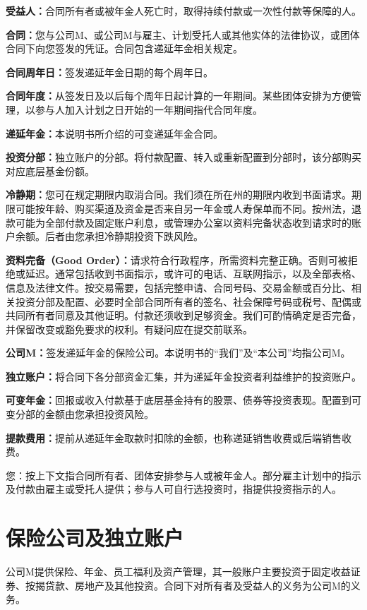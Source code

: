 \documentclass[UTF8,fontset=none,11pt,a4paper]{ctexart}
\begin{document}
\textbf{受益人：}合同所有者或被年金人死亡时，取得持续付款或一次性付款等\allowbreak\mbox{保障的人。}


\textbf{合同：}您与公司M、或公司M与雇主、计划受托人或其他实体的法律协议，或团体合同下向您签发的凭证。合同包含递延年金\allowbreak\mbox{相关规定。}


\textbf{合同周年日：}签发递延年金日期的每\allowbreak\mbox{个周年日。}


\textbf{合同年度：}从签发日及以后每个周年日起计算的一年期间。某些团体安排为方便管理，以参与人加入计划之日开始的一年期间指代\allowbreak\mbox{合同年度。}


\textbf{递延年金：}本说明书所介绍的可变递延\allowbreak\mbox{年金合同。}


\textbf{投资分部：}独立账户的分部。将付款配置、转入或重新配置到分部时，该分部购买对应底层\allowbreak\mbox{基金份额。}


\textbf{冷静期：}您可在规定期限内取消合同。我们须在所在州的期限内收到书面请求。期限可能按年龄、购买渠道及资金是否来自另一年金或人寿保单而不同。按州法，退款可能为全部付款及固定账户利息，或管理办公室以资料完备状态收到请求时的账户余额。后者由您承担冷静期投资\allowbreak\mbox{下跌风险。}


\textbf{资料完备（Good Order）：}请求符合行政程序，所需资料完整正确。否则可被拒绝或延迟。通常包括收到书面指示，或许可的电话、互联网指示，以及全部表格、信息及法律文件。按交易需要，包括完整申请、合同号码、交易金额或百分比、相关投资分部及配置、必要时全部合同所有者的签名、社会保障号码或税号、配偶或共同所有者同意及其他证明。付款还须收到足够资金。我们可酌情确定是否完备，并保留改变或豁免要求的权利。有疑问应在提\allowbreak\mbox{交前联系。}


\textbf{公司M：}签发递延年金的保险公司。本说明书的“我们”及“本公司”均指公司M。


\textbf{独立账户：}将合同下各分部资金汇集，并为递延年金投资者利益维护的\allowbreak\mbox{投资账户。}


\textbf{可变年金：}回报或收入付款基于底层基金持有的股票、债券等投资表现。配置到可变分部的金额由您承担\allowbreak\mbox{投资风险。}


\textbf{提款费用：}提前从递延年金取款时扣除的金额，也称递延销售收费或后端\allowbreak\mbox{销售收费。}


您：按上下文指合同所有者、团体安排参与人或被年金人。部分雇主计划中的指示及付款由雇主或受托人提供；参与人可自行选投资时，指提供投资\allowbreak\mbox{指示的人。}


\section*{保险公司及独立账户}
公司M提供保险、年金、员工福利及资产管理，其一般账户主要投资于固定收益证券、按揭贷款、房地产及其他投资。合同下对所有者及受益人的义务为公司M的义务。
\end{document}
